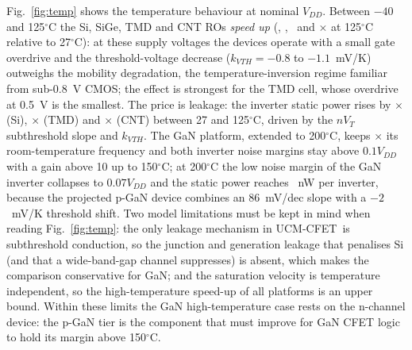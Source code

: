 \documentclass[journal]{IEEEtran}
\newcommand{\ucm}{UCM-CFET}
\begin{document}
Fig.~\ref{fig:temp} shows the temperature behaviour at nominal $V_{DD}$. Between $-40$ and 125$^\circ$C the Si, SiGe, TMD and CNT ROs \emph{speed up} (\fratioHotsi, \fratioHotsige, \fratioHottmd\ and \fratioHotcnt$\times$ at 125$^\circ$C relative to 27$^\circ$C): at these supply voltages the devices operate with a small gate overdrive and the threshold-voltage decrease ($k_{VTH}=-0.8$ to $-1.1$~mV/K) outweighs the mobility degradation, the temperature-inversion regime familiar from sub-0.8~V CMOS; the effect is strongest for the TMD cell, whose overdrive at 0.5~V is the smallest. The price is leakage: the inverter static power rises by \pstatRatiosi$\times$ (Si), \pstatRatiotmd$\times$ (TMD) and \pstatRatiocnt$\times$ (CNT) between 27 and 125$^\circ$C, driven by the $nV_T$ subthreshold slope and $k_{VTH}$. The GaN platform, extended to 200$^\circ$C, keeps \fratioTwoHundredgan$\times$ its room-temperature frequency and both inverter noise margins stay above $0.1V_{DD}$ with a gain above 10 up to 150$^\circ$C; at 200$^\circ$C the low noise margin of the GaN inverter collapses to $0.07V_{DD}$ and the static power reaches \pstatTwoHundredgan~nW per inverter, because the projected p-GaN device combines an 86~mV/dec slope with a $-2$~mV/K threshold shift. Two model limitations must be kept in mind when reading Fig.~\ref{fig:temp}: the only leakage mechanism in \ucm\ is subthreshold conduction, so the junction and generation leakage that penalises Si (and that a wide-band-gap channel suppresses) is absent, which makes the comparison conservative for GaN; and the saturation velocity is temperature independent, so the high-temperature speed-up of all platforms is an upper bound. Within these limits the GaN high-temperature case rests on the n-channel device: the p-GaN tier is the component that must improve for GaN CFET logic to hold its margin above 150$^\circ$C.
\end{document}
